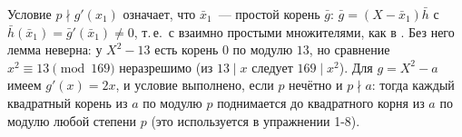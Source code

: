 Условие $p\nmid g'(x_1)$ означает, что $\bar x_1$~--- простой корень $\bar g$: $\bar g=(X-\bar x_1)\bar h$ с
$\bar h(\bar x_1)=\bar g'(\bar x_1)\ne0$, т.\,е.\ с взаимно простыми множителями, как в . Без него лемма неверна:
у $X^2-13$ есть корень $0$ по модулю $13$, но сравнение $x^2\equiv13\pmod{169}$ неразрешимо (из $13\mid x$ следует
$169\mid x^2$). Для $g=X^2-a$ имеем $g'(x)=2x$, и условие выполнено, если $p$ нечётно и $p\nmid a$: тогда каждый квадратный
корень из $a$ по модулю $p$ поднимается до квадратного корня из $a$ по модулю любой степени $p$ (это используется в
упражнении 1-8).
